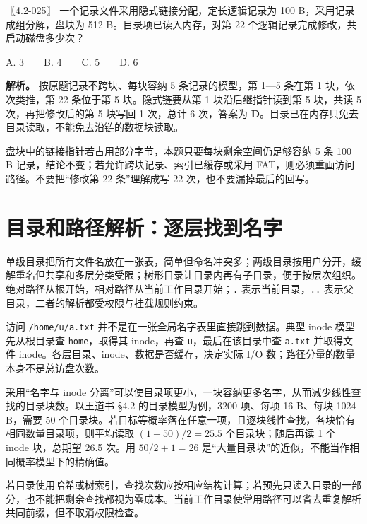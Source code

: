 \begin{example}[配套例题]

〖4.2-025〗 一个记录文件采用隐式链接分配，定长逻辑记录为 100 B，采用记录成组分解，盘块为 512 B。目录项已读入内存，对第 22 个逻辑记录完成修改，共启动磁盘多少次？

A. 3　　B. 4　　C. 5　　D. 6

\end{example}

\textbf{解析。} 按原题记录不跨块、每块容纳 5 条记录的模型，第 1---5 条在第 1 块，依次类推，第 22 条位于第 5 块。隐式链要从第 1 块沿后继指针读到第 5 块，共读 5 次，再把修改后的第 5 块写回 1 次，总计 6 次，答案为 \textbf{D}。目录已在内存只免去目录读取，不能免去沿链的数据块读取。

盘块中的链接指针若占用部分字节，本题只要每块剩余空间仍足够容纳 5 条 100 B 记录，结论不变；若允许跨块记录、索引已缓存或采用 FAT，则必须重画访问路径。不要把``修改第 22 条''理解成写 22 次，也不要漏掉最后的回写。

\section{目录和路径解析：逐层找到名字}\label{OS04-6-6}

单级目录把所有文件名放在一张表，简单但命名冲突多；两级目录按用户分开，缓解重名但共享和多层分类受限；树形目录让目录内再有子目录，便于按层次组织。绝对路径从根开始，相对路径从当前工作目录开始；\texttt{.} 表示当前目录，\texttt{..} 表示父目录，二者的解析都受权限与挂载规则约束。

访问 \texttt{/\allowbreak{}home/\allowbreak{}u/\allowbreak{}a.txt} 并不是在一张全局名字表里直接跳到数据。典型 inode 模型先从根目录查 \texttt{home}，取得其 inode，再查 \texttt{u}，最后在该目录中查 \texttt{a.txt} 并取得文件 inode。各层目录、inode、数据是否缓存，决定实际 I/O 数；路径分量的数量本身不是总访盘次数。

采用``名字与 inode 分离''可以使目录项更小，一块容纳更多名字，从而减少线性查找的目录块数。以王道书 §4.2 的目录模型为例，3200 项、每项 16 B、每块 1024 B，需要 50 个目录块。若目标等概率落在任意一项，且逐块线性查找，各块恰有相同数量目录项，则平均读取 \((1+50)/2=25.5\) 个目录块；随后再读 1 个 inode 块，总期望 26.5 次。用 \(50/2+1=26\) 是``大量目录块''的近似，不能当作相同概率模型下的精确值。

若目录使用哈希或树索引，查找次数应按相应结构计算；若预先只读入目录的一部分，也不能把剩余查找都视为零成本。当前工作目录使常用路径可以省去重复解析共同前缀，但不取消权限检查。

